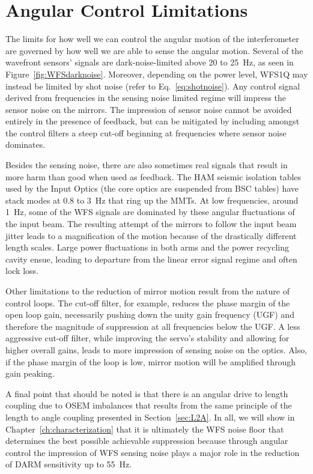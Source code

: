 \section{Angular Control Limitations}
\label{sec:ASClimits}
The limits for how well we can control the angular motion of the interferometer are governed by how well we are able to sense the angular motion. Several of the wavefront sensors' signals are dark-noise-limited above 20 to 25~Hz, as seen in Figure~\ref{fig:WFSdarknoise}. Moreover, depending on the power level, WFS1Q may instead be limited by shot noise (refer to Eq.~\ref{eq:shotnoise}). Any control signal derived from frequencies in the sensing noise limited regime will impress the sensor noise on the mirrors. The impression of sensor noise cannot be avoided entirely in the presence of feedback, but can be mitigated by including amongst the control filters a steep cut-off beginning at frequencies where sensor noise dominates. 

Besides the sensing noise, there are also sometimes real signals that result in more harm than good when used as feedback. The HAM seismic isolation tables used by the Input Optics (the core optics are suspended from BSC tables) have stack modes at 0.8 to 3~Hz that ring up the MMTs.  At low frequencies, around 1~Hz, some of the WFS signals are dominated by these angular fluctuations of the input beam. The resulting attempt of the mirrors to follow the input beam jitter leads to a magnification of the motion because of the drastically different length scales. Large power fluctuations in both arms and the power recycling cavity ensue, leading to departure from the linear error signal regime and often lock loss. 

Other limitations to the reduction of mirror motion result from the nature of control loops. The cut-off filter, for example, reduces the phase margin of the open loop gain, necessarily pushing down the unity gain frequency (UGF) and therefore the magnitude of suppression at all frequencies below the UGF. A less aggressive cut-off filter, while improving the servo's stability and allowing for higher overall gains, leads to more impression of sensing noise on the optics. Also, if the phase margin of the loop is low, mirror motion will be amplified through gain peaking. 

A final point that should be noted is that there is an angular drive to length coupling due to OSEM imbalances that results from the same principle of the length to angle coupling presented in Section~\ref{sec:L2A}. In all, we will show in Chapter~\ref{ch:characterization} that it is ultimately the WFS noise floor that determines the best possible achievable suppression because through angular control the impression of WFS sensing noise plays a major role in the reduction of DARM sensitivity up to 55~Hz.
